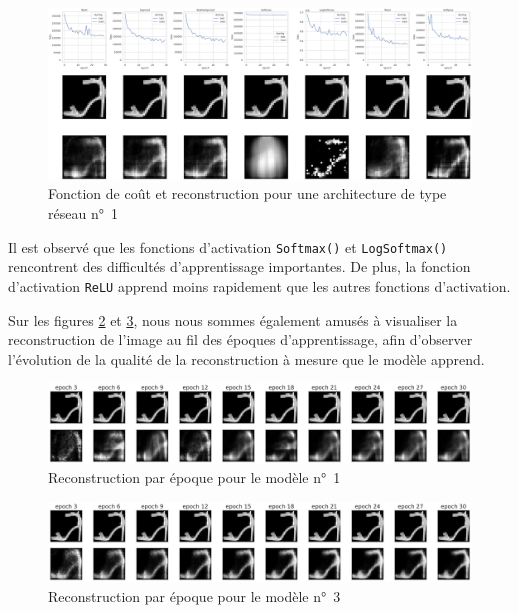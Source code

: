 \documentclass{article}
\begin{document}
\begin{figure}[htbp]
    \centering
    \includegraphics*[width=\textwidth]{encoder_decoder_middle_func_simple_net.pdf}
    \caption{Fonction de coût et reconstruction pour une architecture de type réseau n°~1}
    \label{fig:accfct}
\end{figure}

Il est observé que les fonctions d'activation \texttt{Softmax()} et \texttt{LogSoftmax()} rencontrent des difficultés d'apprentissage importantes. De plus, la fonction d'activation \texttt{ReLU} apprend moins rapidement que les autres fonctions d'activation.

Sur les figures \ref{fig:perEpochSimple} et \ref{fig:perEpochBig}, nous nous sommes également amusés à visualiser la reconstruction de l'image au fil des époques d'apprentissage, afin d'observer l'évolution de la qualité de la reconstruction à mesure que le modèle apprend.

\begin{figure}[htbp]
    \centering
    \includegraphics*[width=\textwidth]{reconstruction_per_epoch_simple_model.pdf}
    \caption{Reconstruction par époque pour le modèle n°~1}
    \label{fig:perEpochSimple}
\end{figure}

\begin{figure}[htbp]
    \centering
    \includegraphics*[width=\textwidth]{reconstruction_per_epoch_big_model.pdf}
    \caption{Reconstruction par époque pour le modèle n°~3}
    \label{fig:perEpochBig}
\end{figure}
\end{document}
